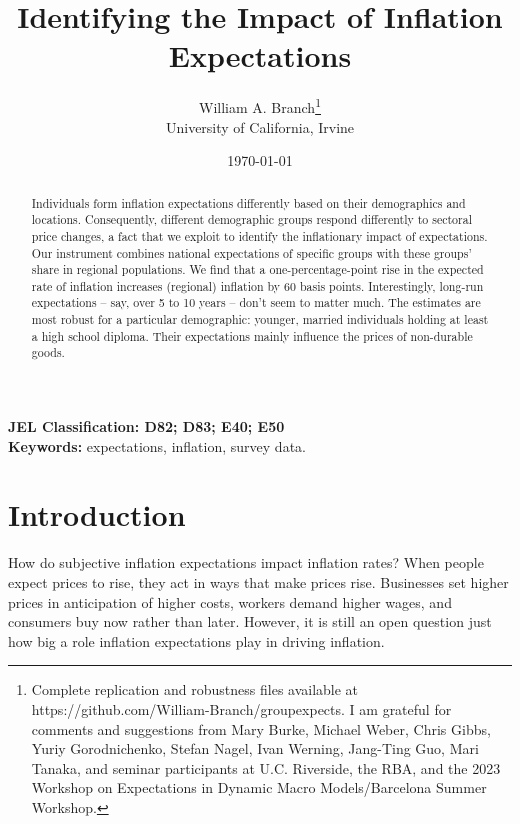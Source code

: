 \documentclass[12pt]{article}
\begin{document}
\title{\vspace{-0 in} Identifying the Impact of Inflation Expectations}
\author{\vspace{0.5 in} William A. Branch\thanks{Complete replication and robustness files available at https://github.com/William-Branch/groupexpects. I am grateful for comments and suggestions from Mary Burke, Michael Weber, Chris Gibbs, Yuriy Gorodnichenko, Stefan Nagel, Ivan Werning, Jang-Ting Guo, Mari Tanaka, and seminar participants at U.C. Riverside, the RBA, and the 2023 Workshop on Expectations in Dynamic Macro Models/Barcelona Summer Workshop. } \\
University of California, Irvine }
\date{\today}
\maketitle
\vspace{0.05in}

\begin{abstract}

Individuals form inflation expectations differently based on their demographics and locations.  Consequently, different demographic groups respond differently to sectoral price changes, a fact that we exploit to identify the inflationary impact of expectations.  Our instrument combines national expectations of specific groups with these groups' share in regional populations.  We find that a one-percentage-point rise in the expected rate of inflation increases (regional) inflation by 60 basis points.  Interestingly, long-run expectations -- say, over 5 to 10 years -- don't seem to matter much.  The estimates are most robust for a particular demographic: younger, married individuals holding at least a high school diploma.  Their expectations mainly influence the prices of non-durable goods.
\end{abstract}

\textbf{JEL Classification: D82; D83; E40; E50}\\

\textbf{Keywords:} expectations, inflation, survey data.

\section{Introduction}

How do subjective inflation expectations impact inflation rates? When people expect prices to rise, they act in ways that make prices rise. Businesses set higher prices in anticipation of higher costs, workers demand higher wages, and consumers buy now rather than later.  However, it is still an open question just how big a role inflation expectations play in driving inflation.
\end{document}
